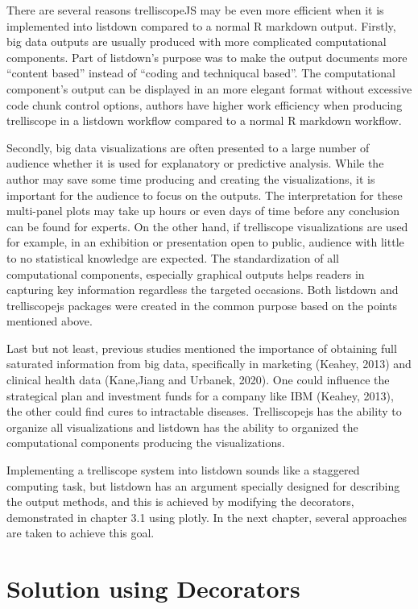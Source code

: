 \documentclass[
]{article}
\begin{document}
There are several reasons trelliscopeJS may be even more efficient when
it is implemented into listdown compared to a normal R markdown output.
Firstly, big data outputs are usually produced with more complicated
computational components. Part of listdown's purpose was to make the
output documents more ``content based'' instead of ``coding and
techniqucal based''. The computational component's output can be
displayed in an more elegant format without excessive code chunk control
options, authors have higher work efficiency when producing trelliscope
in a listdown workflow compared to a normal R markdown workflow.

Secondly, big data visualizations are often presented to a large number
of audience whether it is used for explanatory or predictive analysis.
While the author may save some time producing and creating the
visualizations, it is important for the audience to focus on the
outputs. The interpretation for these multi-panel plots may take up
hours or even days of time before any conclusion can be found for
experts. On the other hand, if trelliscope visualizations are used for
example, in an exhibition or presentation open to public, audience with
little to no statistical knowledge are expected. The standardization of
all computational components, especially graphical outputs helps readers
in capturing key information regardless the targeted occasions. Both
listdown and trelliscopejs packages were created in the common purpose
based on the points mentioned above.

Last but not least, previous studies mentioned the importance of
obtaining full saturated information from big data, specifically in
marketing (Keahey, 2013) and clinical health data (Kane,Jiang and
Urbanek, 2020). One could influence the strategical plan and investment
funds for a company like IBM (Keahey, 2013), the other could find cures
to intractable diseases. Trelliscopejs has the ability to organize all
visualizations and listdown has the ability to organized the
computational components producing the visualizations.

Implementing a trelliscope system into listdown sounds like a staggered
computing task, but listdown has an argument specially designed for
describing the output methods, and this is achieved by modifying the
decorators, demonstrated in chapter 3.1 using plotly. In the next
chapter, several approaches are taken to achieve this goal.

\hypertarget{solution-using-decorators}{%
\section{Solution using Decorators}\label{solution-using-decorators}}
\end{document}
